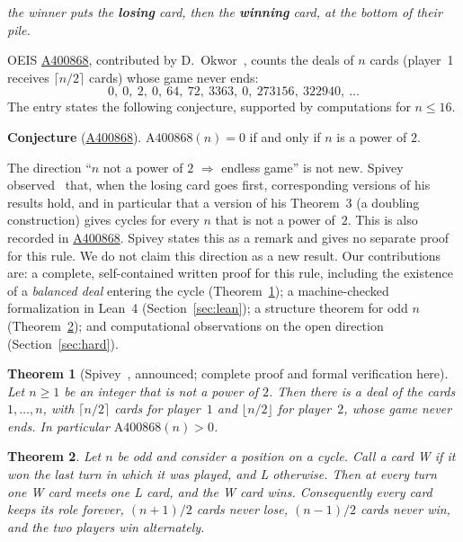 \documentclass[11pt,a4paper]{amsart}
\newtheorem{theorem}{Theorem}
\theoremstyle{definition}
\theoremstyle{remark}
\newcommand{\oeis}[1]{\href{https://oeis.org/#1}{#1}}
\begin{document}
\begin{center}
\emph{the winner puts the \textbf{losing} card, then the \textbf{winning} card, at the bottom of their pile.}
\end{center}

OEIS \oeis{A400868}, contributed by D.~Okwor~\cite{Okwor}, counts the deals of $n$ cards (player~1 receives $\lceil n/2\rceil$ cards) whose game never ends:
\[
0,\ 0,\ 2,\ 0,\ 64,\ 72,\ 3363,\ 0,\ 273156,\ 322940,\ \dots
\]
The entry states the following conjecture, supported by computations for $n\le 16$.

\begin{center}
\textbf{Conjecture} (\oeis{A400868}). $\mathrm{A400868}(n)=0$ if and only if $n$ is a power of $2$.
\end{center}

The direction ``$n$ not a power of $2$ $\Rightarrow$ endless game'' is not new. Spivey observed~\cite[p.~762]{Spivey} that, when the losing card goes first, corresponding versions of his results hold, and in particular that a version of his Theorem~3 (a doubling construction) gives cycles for every $n$ that is not a power of~$2$. This is also recorded in \oeis{A400868}. Spivey states this as a remark and gives no separate proof for this rule. We do not claim this direction as a new result. Our contributions are: a complete, self-contained written proof for this rule, including the existence of a \emph{balanced deal} entering the cycle (Theorem~\ref{thm:easy}); a machine-checked formalization in Lean~4 (Section~\ref{sec:lean}); a structure theorem for odd $n$ (Theorem~\ref{thm:odd}); and computational observations on the open direction (Section~\ref{sec:hard}).

\begin{theorem}[Spivey~\cite{Spivey}, announced; complete proof and formal verification here]\label{thm:easy}
Let $n\ge1$ be an integer that is not a power of $2$. Then there is a deal of the cards $1,\dots,n$, with $\lceil n/2\rceil$ cards for player~$1$ and $\lfloor n/2\rfloor$ for player~$2$, whose game never ends. In particular $\mathrm{A400868}(n)>0$.
\end{theorem}

\begin{theorem}\label{thm:odd}
Let $n$ be odd and consider a position on a cycle. Call a card \emph{W} if it won the last turn in which it was played, and \emph{L} otherwise. Then at every turn one W card meets one L card, and the W card wins. Consequently every card keeps its role forever, $(n+1)/2$ cards never lose, $(n-1)/2$ cards never win, and the two players win alternately.
\end{theorem}
\end{document}
